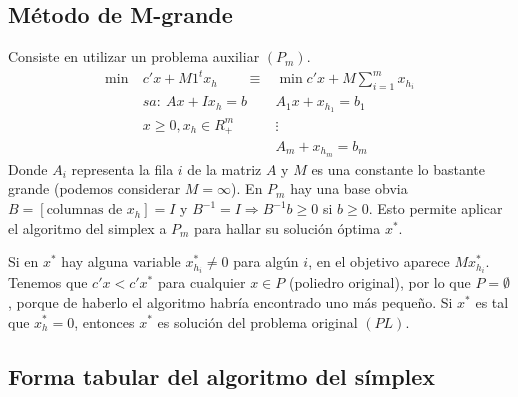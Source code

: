 \documentclass[PM.tex]{subfiles}
\begin{document}
\subsection{Método de M-grande}
Consiste en utilizar un problema auxiliar $(P_m)$.
\begin{align*}
 \min\ & c'x+M1^t x_h\qquad \equiv &\min c'x+M\sum_{i=1}^m x_{h_i}\\
&sa:\ Ax+Ix_h=b              & A_1x+ x_{h_1}=b_1 \\
& x\geq 0, x_h\in R^m_+    & \vdots \\
&                          & A_m+ x_{h_m}=b_m
\end{align*}
Donde $A_i$ representa la fila $i$ de la matriz $A$ y $M$ es una constante lo bastante grande (podemos considerar $M=\infty$).  En $P_m$ hay una base obvia $B=[\text{columnas de }x_h]=I$ y $B^{-1}=I\Rightarrow B^{-1}b\geq 0$ si $b\geq 0$. Esto permite aplicar el algoritmo del simplex a $P_m$ para hallar su solución óptima $x^*$. 

Si en $x^*$ hay alguna variable $x^*_{h_i}\neq 0$ para algún $i$, en el objetivo aparece $Mx^*_{h_i}$. Tenemos que $c'x<c'x^*$ para cualquier $x\in P$ (poliedro original), por lo que $P=\emptyset$, porque de haberlo el algoritmo habría encontrado uno más pequeño.  Si $x^*$ es tal que $x^*_h=0$, entonces $x^*$ es solución del problema original $(PL)$. 

\subsection{Forma tabular del algoritmo del símplex}
\end{document}

